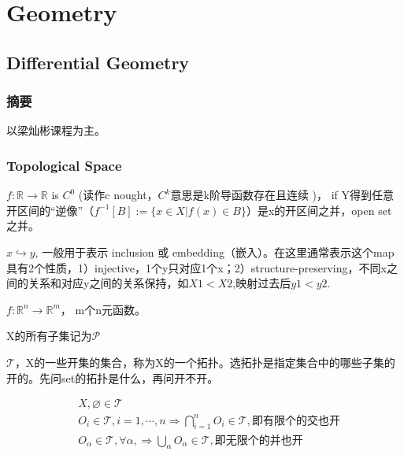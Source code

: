 

\chapter{Geometry}


\section{Differential Geometry}
\subsection{摘要}
以梁灿彬课程为主。


\subsection{Topological Space}


$f: \mathbb{R} \to \mathbb{R} $ is $C^0$ (读作c nought，$C^k$意思是k阶导函数存在且连续 )， if Y得到任意开区间的“逆像”（$f^{-1}[B] := \{x \in X | f(x) \in B\}$）是x的开区间之并，open set 之并。

$x \hookrightarrow y$, 一般用于表示 inclusion 或 embedding（嵌入）。在这里通常表示这个map具有2个性质，1）injective，1个y只对应1个x；2）structure-preserving，不同x之间的关系和对应y之间的关系保持，如$X1 < X2$,映射过去后$y1 < y2$.

$f: \mathbb{R}^n \to \mathbb{R}^m $， m个n元函数。

X的所有子集记为$\mathscr P$

$\mathscr T$，X的一些开集的集合，称为X的一个拓扑。选拓扑是指定集合中的哪些子集的开的。先问set的拓扑是什么，再问开不开。

\begin{equation}
    \begin{split}
    &X, \varnothing \in \mathscr T\\
    &O_i \in\mathscr T, i=1, \cdots, n \Longrightarrow \bigcap _{i=1}^n O_i  \in\mathscr T, 即有限个的交也开 \\
    &O_\alpha \in\mathscr T, \forall \alpha, \Longrightarrow \bigcup  _\alpha  O_\alpha \in\mathscr T,  即无限个的并也开 \\
    \end{split}
  \end{equation}


